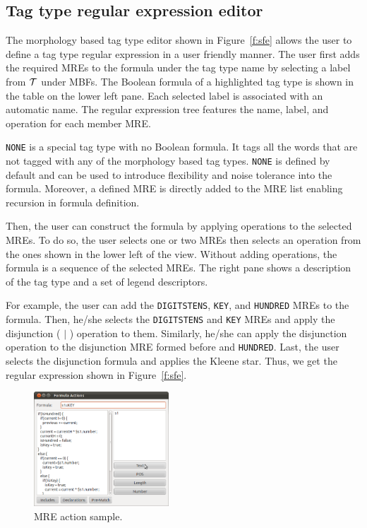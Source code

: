 \subsection{Tag type regular expression editor}
The morphology based tag type editor shown in Figure~\ref{f:sfe} allows the 
user to define a tag type regular expression in a user friendly manner. 
The user first adds the required MREs to the formula under the tag type name 
by selecting a label from ${\cal T}$ under MBFs. 
The Boolean formula of a highlighted tag type is shown in the table on the lower left pane. 
Each selected label is associated with an automatic name. 
The regular expression tree features the name, label, and operation for each member MRE.

{\tt NONE} is a special tag type with no Boolean formula. 
It tags all the words that are not tagged with any of the morphology based tag types. 
{\tt NONE} is defined by default and can be used to introduce flexibility and noise tolerance into the formula. 
Moreover, a defined MRE is directly added to the MRE list enabling recursion 
in formula definition. 


Then, the user can construct the formula by applying operations to the selected MREs. 
To do so, the user selects one or two MREs then selects an operation from the ones shown 
in the lower left of the view. 
Without adding operations, the formula is a sequence of the selected MREs. 
The right pane shows a description of the tag type and a set of legend 
descriptors. 

For example, the user can add the {\tt DIGITSTENS}, {\tt KEY}, and {\tt HUNDRED} MREs to the formula. 
Then, he/she selects the {\tt DIGITSTENS} and {\tt KEY} MREs and apply the disjunction ( $|$ ) 
operation to them. 
Similarly, he/she can apply the disjunction operation to the disjunction MRE formed before and {\tt HUNDRED}. 
Last, the user selects the disjunction formula and applies the Kleene star. 
Thus, we get the regular expression shown in Figure~\ref{f:sfe}.

\begin{figure}[h!]
  \centering
  \includegraphics[width=0.45\textwidth]{figures/actions}
  \caption{\framework MRE action sample.}
  \label{f:actions}
\end{figure}

